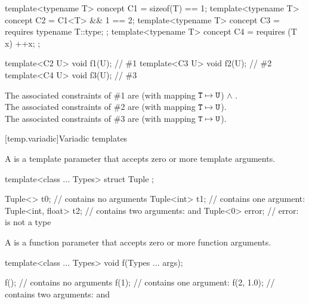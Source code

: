\documentclass{wg21}
\begin{document}
\pnum
\begin{example}
    \begin{codeblock}
        template<typename T> concept C1 = sizeof(T) == 1;
        template<typename T> concept C2 = C1<T> && 1 == 2;
        template<typename T> concept C3 = requires { typename T::type; };
        template<typename T> concept C4 = requires (T x) { ++x; };

        template<C2 U> void f1(U);      // \#1
        template<C3 U> void f2(U);      // \#2
        template<C4 U> void f3(U);      // \#3
    \end{codeblock}
    The associated constraints of \#1 are
     (with mapping $\texttt{T} \mapsto \texttt{U}$) $\land$ .\\
    The associated constraints of \#2 are
     (with mapping $\texttt{T} \mapsto \texttt{U}$).\\
    The associated constraints of \#3 are
     (with mapping $\texttt{T} \mapsto \texttt{U}$).
\end{example}


[temp.variadic]{Variadic templates}

\pnum
A  is a template parameter
that accepts zero or more template arguments.
\begin{example}
    \begin{codeblock}
        template<class ... Types> struct Tuple { };

        Tuple<> t0;                     //  contains no arguments
        Tuple<int> t1;                  //  contains one argument: 
        Tuple<int, float> t2;           //  contains two arguments:  and 
        Tuple<0> error;                 // error:  is not a type
    \end{codeblock}
\end{example}

\pnum
A  is a function parameter
that accepts zero or more function arguments.
\begin{example}
    \begin{codeblock}
        template<class ... Types> void f(Types ... args);

        f();                            //  contains no arguments
        f(1);                           //  contains one argument: 
        f(2, 1.0);                      //  contains two arguments:  and 
    \end{codeblock}
\end{example}
\end{document}
